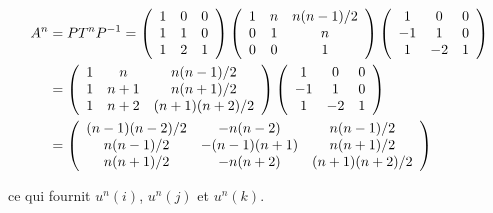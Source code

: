 {\begin{enumerate}
{\begin{align*}\ensuremath
A^n&=PT^nP^{-1}=\left(
\begin{array}{ccc}
1&0&0\\
1&1&0\\
1&2&1
\end{array}
\right)\left(
\begin{array}{ccc}
1&n&n(n-1)/2\\
0&1&n\\
0&0&1
\end{array}
\right)\left(
\begin{array}{ccc}
1&0&0\\
-1&1&0\\
1&-2&1
\end{array}
\right)\\
 &=\left(
\begin{array}{ccc}
1&n&n(n-1)/2\\
1&n+1&n(n+1)/2\\
1&n+2&(n+1)(n+2)/2
\end{array}
\right)\left(
\begin{array}{ccc}
1&0&0\\
-1&1&0\\
1&-2&1
\end{array}
\right)
\\
 &=\left(
\begin{array}{ccc}
(n-1)(n-2)/2&-n(n-2)&n(n-1)/2\\
n(n-1)/2&-(n-1)(n+1)&n(n+1)/2\\
n(n+1)/2&-n(n+2)&(n+1)(n+2)/2
\end{array}
\right)
\end{align*}

ce qui fournit $u^n(i)$, $u^n(j)$ et $u^n(k)$.}
\end{enumerate}
}